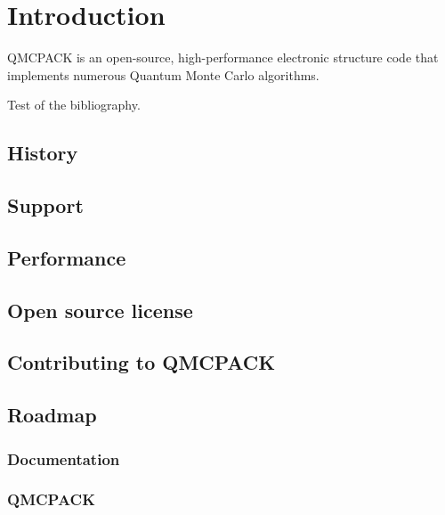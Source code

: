 \chapter{Introduction}
\label{chap:introduction}

QMCPACK is an open-source, high-performance electronic structure code that implements numerous Quantum Monte Carlo algorithms.

Test of the bibliography\cite{CeperleyAlderPRL1980}.

\section{History}
\label{sec:history}

\section{Support}
\label{sec:support}

\section{Performance}
\label{sec:performance}

\section{Open source license}
\label{sec:license}

\section{Contributing to QMCPACK}
\label{sec:contributing}

\section{Roadmap}
\label{sec:roadmap}

\subsection{Documentation}

\subsection{QMCPACK}
